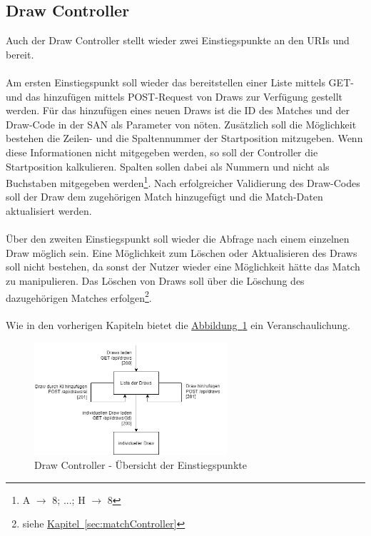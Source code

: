 \subsection{Draw Controller}\label{sec:drawController}
Auch der Draw Controller stellt wieder zwei Einstiegspunkte an den \glspl{URI}  und  bereit. \\
\\
Am ersten Einstiegspunkt soll wieder das bereitstellen einer Liste mittels GET- und das hinzufügen mittels POST-Request von Draws zur Verfügung gestellt werden. Für das hinzufügen eines neuen Draws ist die ID des Matches und der Draw-Code in der \gls{SAN} als Parameter von nöten. Zusätzlich soll die Möglichkeit bestehen die Zeilen- und die Spaltennummer der Startposition mitzugeben. Wenn diese Informationen nicht mitgegeben werden, so soll der Controller die Startposition kalkulieren. Spalten sollen dabei als Nummern und nicht als Buchstaben mitgegeben werden\footnote{A $\rightarrow$ 8; ...; H $\rightarrow$ 8}. Nach erfolgreicher Validierung des Draw-Codes soll der Draw dem zugehörigen Match hinzugefügt und die Match-Daten aktualisiert werden.\\
\\
Über den zweiten Einstiegspunkt soll wieder die Abfrage nach einem einzelnen Draw möglich sein. Eine Möglichkeit zum Löschen oder Aktualisieren des Draws soll nicht bestehen, da sonst der Nutzer wieder eine Möglichkeit hätte das Match zu manipulieren. Das Löschen von Draws soll über die Löschung des dazugehörigen Matches erfolgen\footnote{siehe \hyperref[sec:matchController]{Kapitel~\ref{sec:matchController}}}.\\
\\
Wie in den vorherigen Kapiteln bietet die \hyperref[fig:drawController]{Abbildung~\ref{fig:drawController}} ein Veranschaulichung.
\begin{figure}[htb]
	\includegraphics[width=0.637\textwidth]{images/draw-controller.png}
	\caption{Draw Controller - Übersicht der Einstiegspunkte}
	\label{fig:drawController}
\end{figure}

